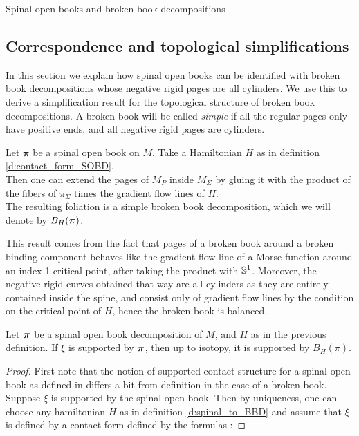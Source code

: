 \documentclass[../main.tex]{subfiles}
\begin{document}
\begin{section}{Spinal open books and broken book decompositions}
\subsection{Correspondence and topological simplifications}

In this section we explain how spinal open books can be identified with broken book decompositions whose negative rigid pages are all cylinders. We use this to derive a simplification result for the topological structure of broken book decompositions. A broken book will be called \textit{simple} if all the regular pages only have positive ends, and all negative rigid pages are cylinders.

\begin{definition}\label{d:spinal_to_BBD}
Let $\boldsymbol{\pi}$ be a spinal open book on $M$. Take a Hamiltonian $H$ as in definition \ref{d:contact_form_SOBD}. \\
Then one can extend the pages of $M_P$ inside $M_\Sigma$ by gluing it with the product of the fibers of $\pi_\Sigma$ times the gradient flow lines of $H$. \\
The resulting foliation is a simple broken book decomposition, which we will denote by $B_H(\boldsymbol{\pi})$. 
\end{definition}

This result comes from the fact that pages of a broken book around a broken binding component behaves like the gradient flow line of a Morse function around an index-1 critical point, after taking the product with $\mathbb{S}^1$. Moreover, the negative rigid curves obtained that way are all cylinders as they are entirely contained inside the spine, and consist only of gradient flow lines by the condition on the critical point of $H$, hence the broken book is balanced. 

\begin{lemma}\label{l:spinal_to_BBD_contact}
Let $\boldsymbol{\pi}$ be a spinal open book decomposition of $M$, and $H$ as in the previous definition. If $\xi $ is supported by $\boldsymbol{\pi}$, then up to isotopy, it is supported by $B_H(\pi)$.
\end{lemma}

\begin{proof}
First note that the notion of supported contact structure for a spinal open book as defined in \cite{SOBD1} differs a bit from definition in the case of a broken book. Suppose $\xi$ is supported by the spinal open book. Then by uniqueness, one can choose any hamiltonian $H$ as in definition \ref{d:spinal_to_BBD} and assume that $\xi$ is defined by a contact form defined by the formulas :




\end{proof}
\end{section}
\end{document}
